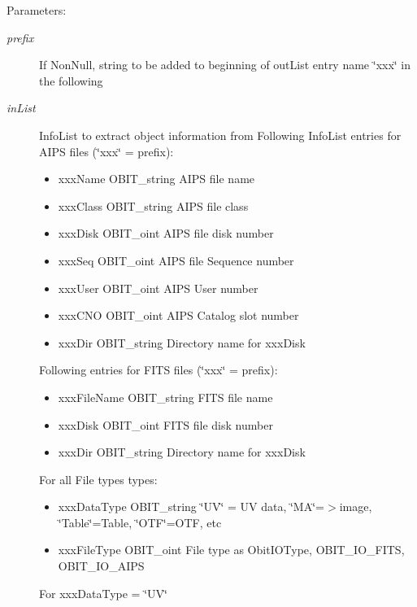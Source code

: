 \begin{Desc}
\item[Parameters:]
\begin{description}
\item[{\em prefix}]If Non\-Null, string to be added to beginning of out\-List entry name \char`\"{}xxx\char`\"{} in the following \item[{\em in\-List}]Info\-List to extract object information from Following Info\-List entries for AIPS files (\char`\"{}xxx\char`\"{} = prefix): \begin{itemize}
\item xxx\-Name OBIT\_\-string AIPS file name \item xxx\-Class OBIT\_\-string AIPS file class \item xxx\-Disk OBIT\_\-oint AIPS file disk number \item xxx\-Seq OBIT\_\-oint AIPS file Sequence number \item xxx\-User OBIT\_\-oint AIPS User number \item xxx\-CNO OBIT\_\-oint AIPS Catalog slot number \item xxx\-Dir OBIT\_\-string Directory name for xxx\-Disk\end{itemize}
Following entries for FITS files (\char`\"{}xxx\char`\"{} = prefix): \begin{itemize}
\item xxx\-File\-Name OBIT\_\-string FITS file name \item xxx\-Disk OBIT\_\-oint FITS file disk number \item xxx\-Dir OBIT\_\-string Directory name for xxx\-Disk\end{itemize}
For all File types types: \begin{itemize}
\item xxx\-Data\-Type OBIT\_\-string \char`\"{}UV\char`\"{} = UV data, \char`\"{}MA\char`\"{}=$>$image, \char`\"{}Table\char`\"{}=Table, \char`\"{}OTF\char`\"{}=OTF, etc \item xxx\-File\-Type OBIT\_\-oint File type as Obit\-IOType, OBIT\_\-IO\_\-FITS, OBIT\_\-IO\_\-AIPS\end{itemize}
For xxx\-Data\-Type = \char`\"{}UV\char`\"{} \begin{itemize}

\end{itemize}
\end{description}
\end{Desc}
